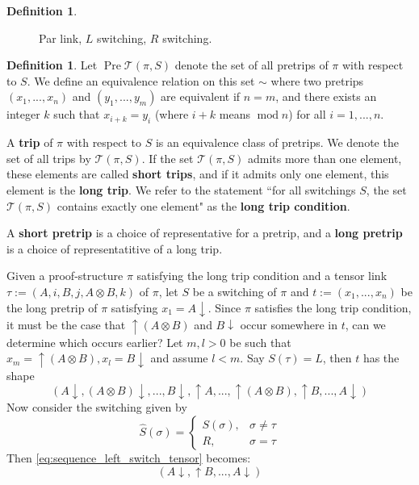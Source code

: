 \documentclass[12pt]{article}
\theoremstyle{plain}
\theoremstyle{definition}
\newtheorem{defn}[thm]{Definition} %
\newcommand{\call}[1]{\mathcal{#1}}
\begin{document}
\begin{defn}
\begin{figure}[h]
    \caption{Par link, $L$ switching, $R$ switching.}
    \label{fig:parrswitching}
\end{figure}
\begin{defn}
Let $\operatorname{Pre}\call{T}(\pi,S)$ denote the set of all pretrips of $\pi$ with respect to $S$. We define an equivalence relation on this set $\sim$ where two pretrips $(x_1,...,x_n)$ and $(y_1,...,y_m)$ are equivalent if $n = m$, and there exists an integer $k$ such that $x_{i + k} = y_i$ (where $i + k$ means $\operatorname{mod} n$) for all $i = 1,...,n$.

A \textbf{trip} of $\pi$ with respect to $S$ is an equivalence class of pretrips. We denote the set of all trips by $\call{T}(\pi,S)$.  If the set $\call{T}(\pi,S)$ admits more than one element, these elements are called \textbf{short trips}, and if it admits only one element, this element is the \textbf{long trip}. We refer to the statement ``for all switchings $S$, the set $\call{T}(\pi,S)$ contains exactly one element" as the \textbf{long trip condition}.

A \textbf{short pretrip} is a choice of representative for a pretrip, and a \textbf{long pretrip} is a choice of representatitive of a long trip.
\end{defn}

\end{defn}
Given a proof-structure $\pi$ satisfying the long trip condition and a tensor link $\tau := (A,i,B,j, A \otimes B,k)$ of $\pi$, let $S$ be a switching of $\pi$ and $t := (x_1,...,x_n)$ be the long pretrip of $\pi$ satisfying $x_1 =A\downarrow$. Since $\pi$ satisfies the long trip condition, it must be the case that $\uparrow (A \otimes B)$ and $B\downarrow$ occur somewhere in $t$, can we determine which occurs earlier? Let $m,l > 0$ be such that $x_m = \uparrow (A \otimes B), x_l = B\downarrow$ and assume $l < m$. Say $S(\tau) = L$, then $t$ has the shape
\begin{equation}\label{eq:sequence_left_switch_tensor}
    (A\downarrow, (A \otimes B)\downarrow, ..., B \downarrow, \uparrow A, ..., \uparrow (A \otimes B), \uparrow B, ..., A\downarrow)
\end{equation}
Now consider the switching given by
\[\hat{S}(\sigma) = \begin{cases}
S(\sigma),& \sigma \neq \tau\\
R, & \sigma = \tau
\end{cases}
\]
Then \eqref{eq:sequence_left_switch_tensor} becomes:
\begin{equation}
    (A\downarrow, \uparrow B, ..., A\downarrow)
\end{equation}
\end{document}
